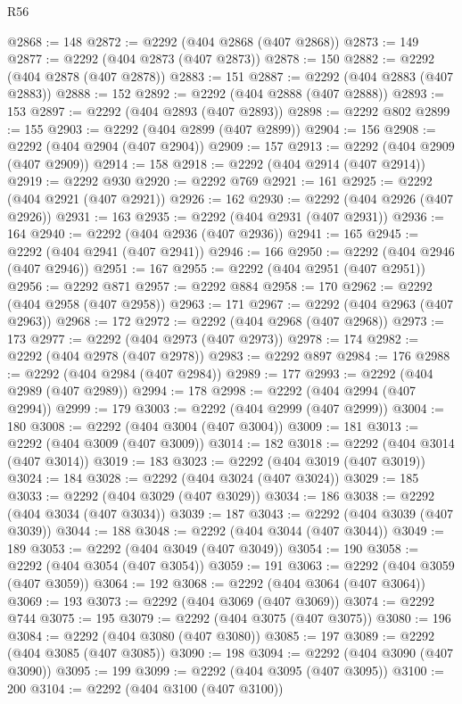 \begin{lexlean}{R56}
\begin{coremodule}
@2868 := 148
@2872 := @2292 (@404 @2868 (@407 @2868))
@2873 := 149
@2877 := @2292 (@404 @2873 (@407 @2873))
@2878 := 150
@2882 := @2292 (@404 @2878 (@407 @2878))
@2883 := 151
@2887 := @2292 (@404 @2883 (@407 @2883))
@2888 := 152
@2892 := @2292 (@404 @2888 (@407 @2888))
@2893 := 153
@2897 := @2292 (@404 @2893 (@407 @2893))
@2898 := @2292 @802
@2899 := 155
@2903 := @2292 (@404 @2899 (@407 @2899))
@2904 := 156
@2908 := @2292 (@404 @2904 (@407 @2904))
@2909 := 157
@2913 := @2292 (@404 @2909 (@407 @2909))
@2914 := 158
@2918 := @2292 (@404 @2914 (@407 @2914))
@2919 := @2292 @930
@2920 := @2292 @769
@2921 := 161
@2925 := @2292 (@404 @2921 (@407 @2921))
@2926 := 162
@2930 := @2292 (@404 @2926 (@407 @2926))
@2931 := 163
@2935 := @2292 (@404 @2931 (@407 @2931))
@2936 := 164
@2940 := @2292 (@404 @2936 (@407 @2936))
@2941 := 165
@2945 := @2292 (@404 @2941 (@407 @2941))
@2946 := 166
@2950 := @2292 (@404 @2946 (@407 @2946))
@2951 := 167
@2955 := @2292 (@404 @2951 (@407 @2951))
@2956 := @2292 @871
@2957 := @2292 @884
@2958 := 170
@2962 := @2292 (@404 @2958 (@407 @2958))
@2963 := 171
@2967 := @2292 (@404 @2963 (@407 @2963))
@2968 := 172
@2972 := @2292 (@404 @2968 (@407 @2968))
@2973 := 173
@2977 := @2292 (@404 @2973 (@407 @2973))
@2978 := 174
@2982 := @2292 (@404 @2978 (@407 @2978))
@2983 := @2292 @897
@2984 := 176
@2988 := @2292 (@404 @2984 (@407 @2984))
@2989 := 177
@2993 := @2292 (@404 @2989 (@407 @2989))
@2994 := 178
@2998 := @2292 (@404 @2994 (@407 @2994))
@2999 := 179
@3003 := @2292 (@404 @2999 (@407 @2999))
@3004 := 180
@3008 := @2292 (@404 @3004 (@407 @3004))
@3009 := 181
@3013 := @2292 (@404 @3009 (@407 @3009))
@3014 := 182
@3018 := @2292 (@404 @3014 (@407 @3014))
@3019 := 183
@3023 := @2292 (@404 @3019 (@407 @3019))
@3024 := 184
@3028 := @2292 (@404 @3024 (@407 @3024))
@3029 := 185
@3033 := @2292 (@404 @3029 (@407 @3029))
@3034 := 186
@3038 := @2292 (@404 @3034 (@407 @3034))
@3039 := 187
@3043 := @2292 (@404 @3039 (@407 @3039))
@3044 := 188
@3048 := @2292 (@404 @3044 (@407 @3044))
@3049 := 189
@3053 := @2292 (@404 @3049 (@407 @3049))
@3054 := 190
@3058 := @2292 (@404 @3054 (@407 @3054))
@3059 := 191
@3063 := @2292 (@404 @3059 (@407 @3059))
@3064 := 192
@3068 := @2292 (@404 @3064 (@407 @3064))
@3069 := 193
@3073 := @2292 (@404 @3069 (@407 @3069))
@3074 := @2292 @744
@3075 := 195
@3079 := @2292 (@404 @3075 (@407 @3075))
@3080 := 196
@3084 := @2292 (@404 @3080 (@407 @3080))
@3085 := 197
@3089 := @2292 (@404 @3085 (@407 @3085))
@3090 := 198
@3094 := @2292 (@404 @3090 (@407 @3090))
@3095 := 199
@3099 := @2292 (@404 @3095 (@407 @3095))
@3100 := 200
@3104 := @2292 (@404 @3100 (@407 @3100))

\end{coremodule}
\end{lexlean}
